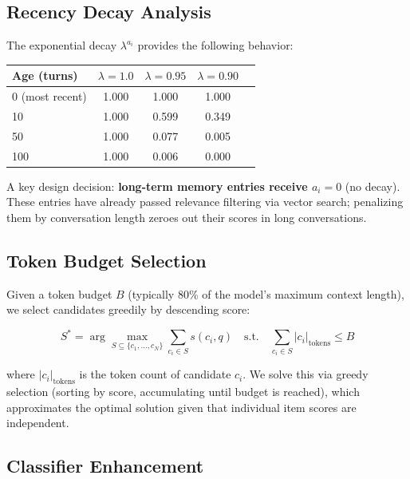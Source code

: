\documentclass[11pt,a4paper]{article}
\begin{document}
\subsection{Recency Decay Analysis}

The exponential decay $\lambda^{a_i}$ provides the following behavior:

\begin{center}
\begin{tabular}{lcccc}
\toprule
Age (turns) & $\lambda = 1.0$ & $\lambda = 0.95$ & $\lambda = 0.90$ \\
\midrule
0 (most recent) & 1.000 & 1.000 & 1.000 \\
10 & 1.000 & 0.599 & 0.349 \\
50 & 1.000 & 0.077 & 0.005 \\
100 & 1.000 & 0.006 & 0.000 \\
\bottomrule
\end{tabular}
\end{center}

A key design decision: \textbf{long-term memory entries receive $a_i = 0$} (no decay).
These entries have already passed relevance filtering via vector search; penalizing
them by conversation length zeroes out their scores in long conversations.

\subsection{Token Budget Selection}

Given a token budget $B$ (typically 80\% of the model's maximum context length),
we select candidates greedily by descending score:

\begin{equation}
\label{eq:selection}
S^* = \arg\max_{S \subseteq \{c_1, \ldots, c_N\}} \sum_{c_i \in S} s(c_i, q)
\quad \text{s.t.} \quad \sum_{c_i \in S} |c_i|_\text{tokens} \leq B
\end{equation}

where $|c_i|_\text{tokens}$ is the token count of candidate $c_i$. We solve this
via greedy selection (sorting by score, accumulating until budget is reached), which
approximates the optimal solution given that individual item scores are independent.

\subsection{Classifier Enhancement}
\label{sec:classifier}
\end{document}
